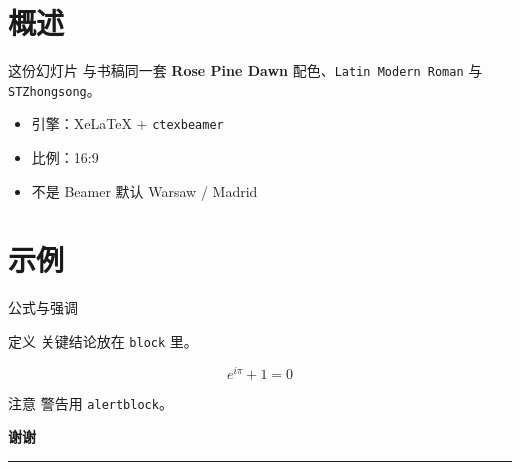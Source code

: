 \section{概述}

\begin{frame}{这份幻灯片}
  与书稿同一套 \textbf{Rose Pine Dawn} 配色、\texttt{Latin Modern Roman} 与 \texttt{STZhongsong}。
  \begin{itemize}
    \item 引擎：XeLaTeX + \texttt{ctexbeamer}
    \item 比例：16:9
    \item 不是 Beamer 默认 Warsaw / Madrid
  \end{itemize}
\end{frame}

\section{示例}

\begin{frame}{公式与强调}
  \begin{block}{定义}
    关键结论放在 \texttt{block} 里。
  \end{block}
  \begin{equation*}
    e^{i\pi} + 1 = 0
  \end{equation*}
  \begin{alertblock}{注意}
    警告用 \texttt{alertblock}。
  \end{alertblock}
\end{frame}

\begin{frame}[plain]
  \vfill
  \centering
  {\Large\bfseries\color{chaptercolor} 谢谢\par}
  \vspace{0.6em}
  {\color{coveraccent}\rule{0.22\textwidth}{1.2pt}}
  \vfill
\end{frame}
